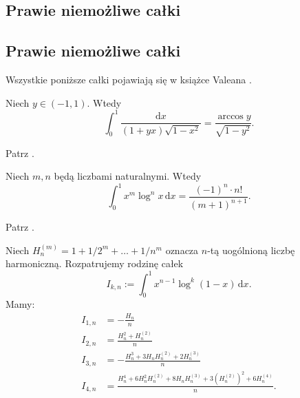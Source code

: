 \subsection{Prawie niemożliwe całki}
\subsection{Prawie niemożliwe całki} %
Wszystkie poniższe całki pojawiają się w książce Valeana \cite{valean19}.

\begin{problem}
    \label{valean_grundpreis}%
    Niech $y \in (-1, 1)$.
    Wtedy
    \begin{equation}
        \int_0^1 \frac{\mathrm{d}x}{(1+yx) \sqrt{1-x^2}} = \frac{\arccos y}{\sqrt{1-y^2}}.
    \end{equation}
\end{problem}

\begin{solution} %
    Patrz \cite[s. 1]{valean19}. %
\end{solution} %

\begin{problem}
    \label{valean_zeugenstand}%
    Niech $m, n$ będą liczbami naturalnymi.
    Wtedy
    \begin{equation}
        \int_0^1 x^m \log^n x \,\mathrm{d} x = \frac{(-1)^n \cdot n!}{(m+1)^{n+1}}.
    \end{equation}
\end{problem}

\begin{solution} %
    Patrz \cite[s. 1]{valean19}. %
\end{solution} %

\begin{problem}
    Niech $H_{n}^{(m)} = 1 + 1/2^m + \ldots + 1/n^m$ oznacza $n$-tą uogólnioną liczbę harmoniczną.
    Rozpatrujemy rodzinę całek
    \begin{equation}
        I_{k,n} := \int_0^1 x^{n-1} \log^k (1-x) \,\mathrm{d} x.
    \end{equation}
    Mamy:
    \begin{align}
        I_{1,n} & = - \frac{H_n}{n} \\
        I_{2,n} & = \frac{H_n^2 + H_n^{(2)}}{n} \\
        I_{3,n} & = - \frac{H_n^3 + 3H_nH_n^{(2)} + 2H_n^{(3)}}{n} \\
        I_{4,n} & = \frac{H_n^4 + 6H_n^2 H_n^{(2)} + 8H_nH_n^{(3)} + 3(H_n^{(2)})^2 + 6H_n^{(4)}}{n}.
    \end{align}
\end{problem}

